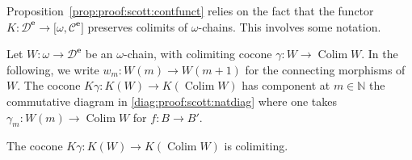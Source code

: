 \documentclass[%
  a4paper,
  UKenglish,
  cleveref,
  autoref,
  thm-restate,
  numberwithinsect,
]{lipics-v2021}
\newcommand\NN{\mathbb{N}}
\newcommand\cat\mathcal
\newcommand\funct[1]{\lbrack #1 \rbrack}
\newcommand\Colim{\mathop{\mathrm{Colim}}}
\newcommand\ep{{\mathbf{e}}}
\begin{document}
Proposition~\ref{prop:proof:scott:contfunct}
relies on the fact that the functor
$K \colon \cat D^\ep \to \funct{\omega,\cat C^\ep}$
preserves colimits of $\omega$-chains.
This involves some notation.

Let $W \colon \omega \to \cat D^\ep$ be an $\omega$-chain,
with colimiting cocone $\gamma \colon W \to \Colim W$.
In the following, we write $w_m \colon W(m) \to W(m+1)$
for the connecting morphisms of $W$.
The cocone $K \gamma \colon K(W) \to K(\Colim W)$
has component at $m \in \NN$
the commutative diagram in \eqref{diag:proof:scott:natdiag}
where one takes $\gamma_m \colon W(m) \to \Colim W$
for $f \colon B \to B'$.


\begin{lemma}
\label{lem:proof:scott:colimiting}
The cocone $K\gamma \colon K(W) \to K(\Colim W)$
is colimiting.
\end{lemma}
\end{document}
